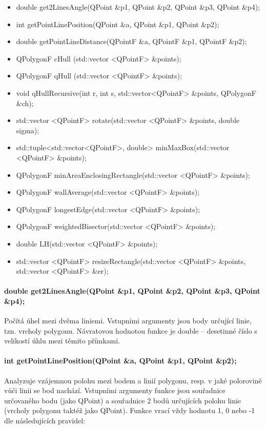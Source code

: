\documentclass[11pt]{article}
\begin{document}
	\begin{itemize}
		\item double get2LinesAngle(QPoint \&p1, QPoint \&p2, QPoint \&p3, QPoint \&p4);
		\item int getPointLinePosition(QPoint \&a, QPoint \&p1, QPoint \&p2);
		\item double getPointLineDistance(QPointF \&a, QPointF \&p1, QPointF \&p2);
		\item QPolygonF cHull (std::vector <QPointF> \&points);
		\item QPolygonF qHull (std::vector <QPointF> \&points);
		\item void qHullRecursive(int r, int s, std::vector<QPointF> \&points, QPolygonF \&ch);
		\item std::vector <QPointF> rotate(std::vector <QPointF> \&points, double sigma);
		\item std::tuple<std::vector<QPointF>, double> minMaxBox(std::vector <QPointF> \&points);
		\item QPolygonF minAreaEnclosingRectangle(std::vector <QPointF> \&points);
		\item QPolygonF wallAverage(std::vector <QPointF> \&points);
		\item QPolygonF longestEdge(std::vector <QPointF> \&points);
		\item QPolygonF weightedBisector(std::vector <QPointF> \&points);
		\item double LH(std::vector <QPointF> \&points);
		\item std::vector <QPointF> resizeRectangle(std::vector <QPointF> \&points, std::vector <QPointF> \&er);
	\end{itemize}
	
	\paragraph{double get2LinesAngle(QPoint \&p1, QPoint \&p2, QPoint \&p3, QPoint \&p4);}
	Počítá úhel mezi dvěma liniemi. Vstupními argumenty jsou body určující linie, tzn. vrcholy polygonu. Návratovou hodnotou funkce je double – desetinné číslo s velikostí úhlu mezi těmito přímkami.  
	
	\paragraph{int getPointLinePosition(QPoint \&a, QPoint \&p1, QPoint \&p2);}
	Analyzuje vzájemnou polohu mezi bodem a linií polygonu, resp. v jaké polorovině vůči linii se bod nachází. Vstupními argumenty funkce jsou souřadnice určovaného bodu (jako QPoint) a souřadnice 2 bodů určujících polohu linie (vrcholy polygonu taktéž jako QPoint). Funkce vrací vždy hodnotu 1, 0 nebo -1 dle následujících pravidel:
	
\end{document}
